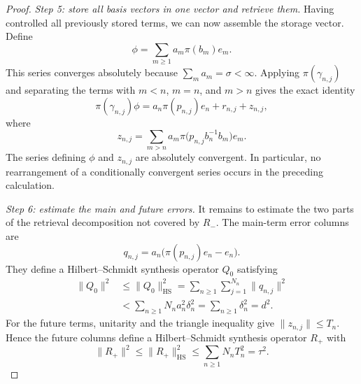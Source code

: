 \documentclass[10pt,a4paper]{amsart}
\numberwithin{equation}{section}
\newcommand{\HS}{\mathrm{HS}}
\newcommand{\Step}[1]{\par\medskip\noindent\textit{#1.}\quad}
\begin{document}
\begin{proof}
\Step{Step 5: store all basis vectors in one vector and retrieve them}
Having controlled all previously stored terms, we can now assemble the
storage vector.  Define
\begin{equation}\label{eq:storage-vector}
 \phi=\sum_{m\geq1}a_m\pi(b_m)e_m.
\end{equation}
This series converges absolutely because $\sum_ma_m=\sigma<\infty$.  Applying
$\pi(\gamma_{n,j})$ and separating the terms with $m<n$, $m=n$, and $m>n$
gives the exact identity
\begin{equation}\label{eq:retrieval-decomposition}
 \pi(\gamma_{n,j})\phi
 =a_n\pi(p_{n,j})e_n+r_{n,j}+z_{n,j},
\end{equation}
where
\begin{equation}\label{eq:future-column}
 z_{n,j}
 =\sum_{m>n}a_m
   \pi\bigl(p_{n,j}b_n^{-1}b_m\bigr)e_m.
\end{equation}
The series defining $\phi$ and $z_{n,j}$ are absolutely convergent.  In
particular, no rearrangement of a conditionally convergent series occurs in
the preceding calculation.

\Step{Step 6: estimate the main and future errors}
It remains to estimate the two parts of the retrieval decomposition not
covered by $R_-$.  The main-term error columns are
\[
 q_{n,j}=a_n\bigl(\pi(p_{n,j})e_n-e_n\bigr).
\]
They define a Hilbert--Schmidt synthesis operator $Q_0$ satisfying
\begin{equation}\label{eq:main-error-bound}
\begin{aligned}
 \|Q_0\|^2
 &\leq\|Q_0\|_{\HS}^2
   =\sum_{n\geq1}\sum_{j=1}^{N_n}\|q_{n,j}\|^2 \\
 &<\sum_{n\geq1}N_na_n^2\delta_n^2
   =\sum_{n\geq1}\delta_n^2=d^2.
\end{aligned}
\end{equation}
For the future terms, unitarity and the triangle inequality give
$\|z_{n,j}\|\leq T_n$.  Hence
the future columns define a Hilbert--Schmidt synthesis operator $R_+$ with
\begin{equation}\label{eq:future-error-bound}
 \|R_+\|^2
 \leq\|R_+\|_{\HS}^2
 \leq\sum_{n\geq1}N_nT_n^2=\tau^2.
\end{equation}


\end{proof}
\end{document}

